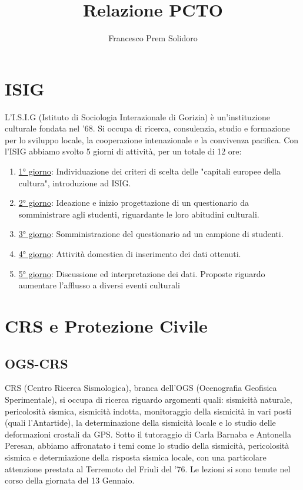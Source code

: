 \documentclass{article}
\author{Francesco Prem Solidoro}
\title{Relazione PCTO}
\begin{document}
  \maketitle
  \tableofcontents
  \section{ISIG}
  L'I.S.I.G (Istituto di Sociologia Interazionale di Gorizia) è un'instituzione culturale fondata nel '68. Si occupa di ricerca, consulenzia, studio e formazione per lo sviluppo locale, la cooperazione intenazionale e la convivenza pacifica. Con l'ISIG abbiamo svolto 5 giorni di attività, per un totale di 12 ore:
  \begin{enumerate}
    \item \underline{1° giorno}: Individuazione dei criteri di scelta delle "capitali europee della cultura", introduzione ad ISIG.
    \item \underline{2° giorno}: Ideazione e inizio progettazione di un questionario da somministrare agli studenti, riguardante le loro abitudini culturali.
    \item \underline{3° giorno}: Somministrazione del questionario ad un campione di studenti.
    \item \underline{4° giorno}: Attività domestica di inserimento dei dati ottenuti.
    \item \underline{5° giorno}: Discussione ed interpretazione dei dati. Proposte riguardo aumentare l'afflusso a diversi eventi culturali
  \end{enumerate}
  \section{CRS e Protezione Civile}
  \subsection{OGS-CRS}
  CRS (Centro Ricerca Sismologica), branca dell'OGS (Ocenografia Geofisica Sperimentale), si occupa di ricerca riguardo argomenti quali: sismicità naturale, pericolosità sismica, sismicità indotta, monitoraggio della sismicità in vari posti (quali l'Antartide), la determinazione della sismicità locale e lo studio delle deformazioni crostali da GPS. Sotto il tutoraggio di Carla Barnaba e Antonella Peresan, abbiamo affronatato i temi come lo studio della sismicità, pericolosità sismica e determiazione della risposta sismica locale, con una particolare attenzione prestata al Terremoto del Friuli del '76. Le lezioni si sono tenute nel corso della giornata del 13 Gennaio.
\end{document}
